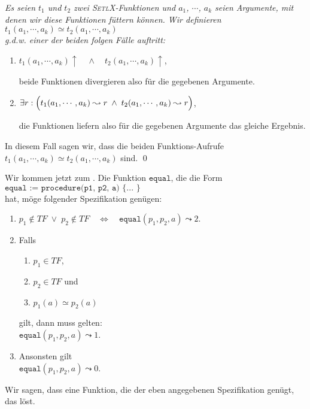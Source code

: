\begin{Definition}[$\simeq$] 
{\em 
Es seien $t_1$ und $t_2$ zwei \textsc{SetlX}-Funktionen und
  $a_1$, $\cdots$, $a_k$ seien Argumente, mit denen wir diese Funktionen füttern können. Wir definieren \\[0.1cm]
\hspace*{1.3cm} $t_1(a_1,\cdots,a_k) \simeq t_2(a_1,\cdots,a_k)$ \\[0.1cm]
g.d.w. einer der beiden folgen Fälle auftritt:
\begin{enumerate}
\item $t_1(a_1,\cdots,a_k)\uparrow \quad\wedge\quad t_2(a_1,\cdots,a_k)\uparrow$,

      beide Funktionen divergieren also für die gegebenen Argumente.
\item $\exists r: \Bigl(t_1(a_1,\cdots,a_k) \leadsto r \;\wedge\; t_2(a_1,\cdots,a_k) \leadsto r\Bigr)$,

      die Funktionen liefern also für die gegebenen Argumente das gleiche Ergebnis.
\end{enumerate}
      In diesem Fall sagen wir, dass die beiden Funktions-Aufrufe 
      $t_1(a_1,\cdots,a_k) \simeq t_2(a_1,\cdots,a_k)$  sind.  
      \qed
}
\end{Definition}

\noindent
Wir kommen jetzt zum .  Die Funktion $\texttt{equal}$, die die Form
\\[0.2cm]
\hspace*{1.3cm}
$\texttt{equal := procedure(p1, p2, a) \{ ... \}}$
\\[0.2cm]
hat, möge folgender Spezifikation genügen:
\begin{enumerate}
\item $p_1 \not\in T\!F \;\vee\; p_2 \not\in T\!F \quad\Leftrightarrow\quad \mathtt{equal}(p_1, p_2, a) \leadsto 2$.
\item Falls 
  \begin{enumerate}
  \item $p_1 \in T\!F$,
  \item $p_2 \in T\!F$ \quad und
  \item $p_1(a) \simeq p_2(a)$
  \end{enumerate}
    gilt, dann muss gelten: \\[0.1cm]
   \hspace*{1.3cm}  $\mathtt{equal}(p_1, p_2, a) \leadsto 1$.
\item Ansonsten gilt \\[0.1cm]
      \hspace*{1.3cm} $\mathtt{equal}(p_1, p_2, a) \leadsto 0$.
\end{enumerate}
Wir sagen, dass eine Funktion, die der eben angegebenen Spezifikation genügt, das
 löst.

